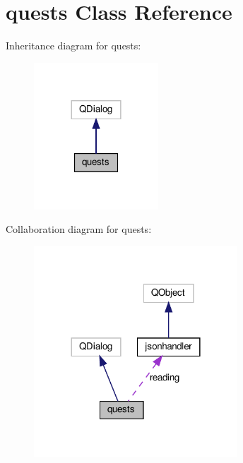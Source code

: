 \hypertarget{classquests}{}\section{quests Class Reference}
\label{classquests}


Inheritance diagram for quests\+:
\nopagebreak
\begin{figure}[H]
\begin{center}
\leavevmode
\includegraphics[width=132pt]{classquests__inherit__graph}
\end{center}
\end{figure}


Collaboration diagram for quests\+:
\nopagebreak
\begin{figure}[H]
\begin{center}
\leavevmode
\includegraphics[width=216pt]{classquests__coll__graph}
\end{center}
\end{figure}
